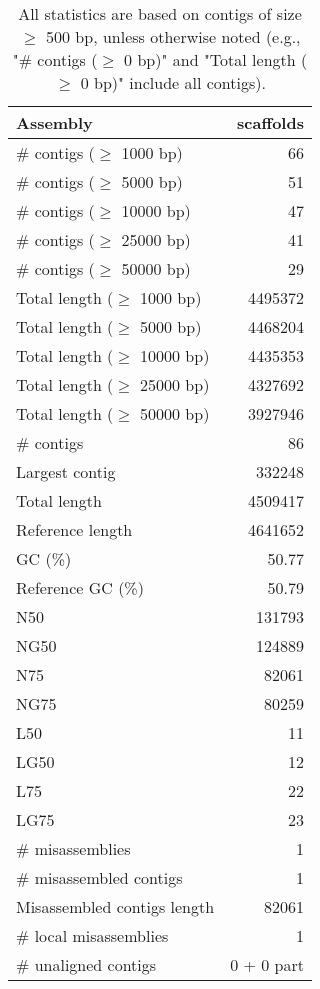 \documentclass[12pt,a4paper]{article}
\begin{document}
\begin{table}[ht]
\begin{center}
\caption{All statistics are based on contigs of size $\geq$ 500 bp, unless otherwise noted (e.g., "\# contigs ($\geq$ 0 bp)" and "Total length ($\geq$ 0 bp)" include all contigs).}
\begin{tabular}{|l*{1}{|r}|}
\hline
Assembly & scaffolds \\ \hline
\# contigs ($\geq$ 1000 bp) & 66 \\ \hline
\# contigs ($\geq$ 5000 bp) & 51 \\ \hline
\# contigs ($\geq$ 10000 bp) & 47 \\ \hline
\# contigs ($\geq$ 25000 bp) & 41 \\ \hline
\# contigs ($\geq$ 50000 bp) & 29 \\ \hline
Total length ($\geq$ 1000 bp) & 4495372 \\ \hline
Total length ($\geq$ 5000 bp) & 4468204 \\ \hline
Total length ($\geq$ 10000 bp) & 4435353 \\ \hline
Total length ($\geq$ 25000 bp) & 4327692 \\ \hline
Total length ($\geq$ 50000 bp) & 3927946 \\ \hline
\# contigs & 86 \\ \hline
Largest contig & 332248 \\ \hline
Total length & 4509417 \\ \hline
Reference length & 4641652 \\ \hline
GC (\%) & 50.77 \\ \hline
Reference GC (\%) & 50.79 \\ \hline
N50 & 131793 \\ \hline
NG50 & 124889 \\ \hline
N75 & 82061 \\ \hline
NG75 & 80259 \\ \hline
L50 & 11 \\ \hline
LG50 & 12 \\ \hline
L75 & 22 \\ \hline
LG75 & 23 \\ \hline
\# misassemblies & 1 \\ \hline
\# misassembled contigs & 1 \\ \hline
Misassembled contigs length & 82061 \\ \hline
\# local misassemblies & 1 \\ \hline
\# unaligned contigs & 0 + 0 part \\ \hline

\end{tabular}
\end{center}
\end{table}
\end{document}
